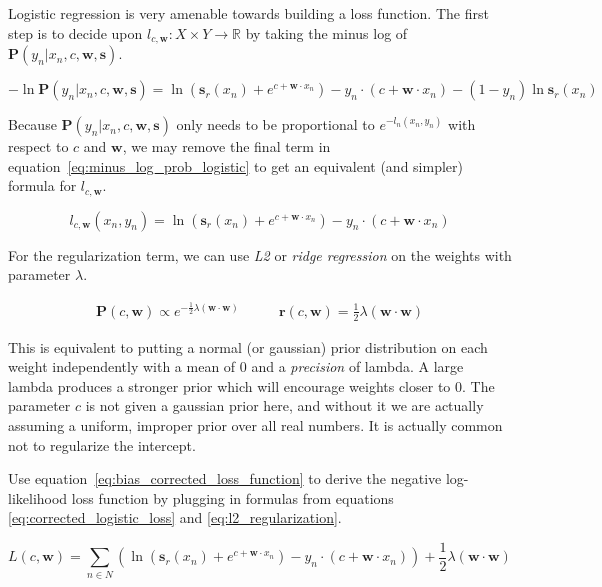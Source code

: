 \documentclass[twoside]{article}
\begin{document}
Logistic regression is very amenable towards building a loss function. The first step is to  decide upon \(l_{c,\mathbf{w}}: X \times Y \rightarrow \mathbb{R}\) by taking the minus log of \(\mathbf{P}(y_n|x_n,c,\mathbf{w},\mathbf{s})\).

\begin{equation}
\label{eq:minus_log_prob_logistic}
-\ln \mathbf{P}(y_n|x_n,c,\mathbf{w},\mathbf{s})=\ln\left(\mathbf{s}_r(x_n)+e^{c+\mathbf{w} \cdot x_n}\right) - y_n \cdot (c+\mathbf{w} \cdot x_n) - (1 - y_n) \ln \mathbf{s}_r(x_n)
\end{equation}

Because \(\mathbf{P}(y_n|x_n,c,\mathbf{w},\mathbf{s})\) only needs to be proportional to \(e^{-l_n(x_n,y_n)}\) with respect to \(c\) and \(\mathbf{w}\), we may remove the final term in equation~\eqref{eq:minus_log_prob_logistic} to get an equivalent (and simpler) formula for \(l_{c,\mathbf{w}}\).

\begin{equation}
\label{eq:corrected_logistic_loss}
l_{c,\mathbf{w}}(x_n,y_n)=\ln\left(\mathbf{s}_r(x_n)+e^{c+\mathbf{w} \cdot x_n}\right) - y_n \cdot (c+\mathbf{w} \cdot x_n)
\end{equation}

For the regularization term, we can use \textit{L2} or \textit{ridge regression} on the weights with parameter \(\lambda\).

\begin{align}
\label{eq:l2_regularization}
\mathbf{P}(c,\mathbf{w}) \propto e^{-\frac{1}{2}\lambda(\mathbf{w} \cdot \mathbf{w})}&
\qquad\mathbf{r}(c,\mathbf{w})=\frac{1}{2}\lambda(\mathbf{w} \cdot \mathbf{w})
\end{align}

This is equivalent to putting a normal (or gaussian) prior distribution on each weight independently with a mean of \(0\) and a \textit{precision} of lambda. A large lambda produces a stronger prior which will encourage weights closer to 0. The parameter \(c\) is not given a gaussian prior here, and without it we are actually assuming a uniform, improper prior over all real numbers. It is actually common not to regularize the intercept.

Use equation~\eqref{eq:bias_corrected_loss_function} to derive the negative log-likelihood loss function by plugging in formulas from equations \eqref{eq:corrected_logistic_loss} and \eqref{eq:l2_regularization}.

\[L(c,\mathbf{w})=\sum_{n \in  N} \left (\ln\left (\mathbf{s}_r(x_n)+e^{c+\mathbf{w} \cdot x_n}\right ) -y_n \cdot (c+\mathbf{w} \cdot x_n) \right )+ \frac{1}{2}\lambda(\mathbf{w} \cdot \mathbf{w})\]
\end{document}

